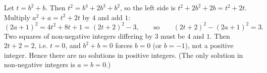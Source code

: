 Let $t=b^2+b$. Then $t^2=b^4+2b^3+b^2$, so the left side is $t^2+2b^2+2b=t^2+2t$. Multiply $a^2+a=t^2+2t$ by $4$ and add $1$:
\[(2a+1)^2=4t^2+8t+1=(2t+2)^2-3,\qquad\text{so}\qquad (2t+2)^2-(2a+1)^2=3.\]
Two squares of non-negative integers differing by $3$ must be $4$ and $1$. Then $2t+2=2$, i.e. $t=0$, and $b^2+b=0$ forces $b=0$ (or $b=-1$), not a positive integer. Hence there are no solutions in positive integers. (The only solution in non-negative integers is $a=b=0$.)
